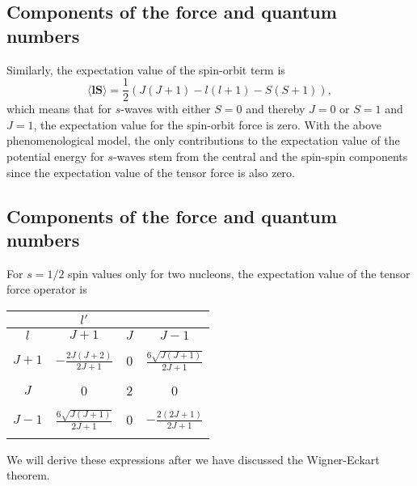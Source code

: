 \documentclass[%
twoside,                 %
final,                   %
10pt]{article}
\begin{document}
\subsection{Components of the force and quantum numbers}
\begin{block}{}

Similarly, the expectation value of the spin-orbit term is 
\[
\langle \mathbf{l}\mathbf{S} \rangle = \frac{1}{2}\left( J(J+1)-l(l+1)-S(S+1)\right),
\]
which means that for $s$-waves with either $S=0$ and thereby $J=0$ or $S=1$ and $J=1$, 
the expectation value for the
spin-orbit force is zero. With the above phenomenological model, the
only contributions to the expectation value of the potential energy for $s$-waves
stem  from the central and the spin-spin components since the
expectation value of the tensor force is also zero.
\end{block}

\subsection{Components of the force and quantum numbers}
\begin{block}{}
 For $s=1/2$ spin values only for two nucleons, the expectation value of the tensor force operator is 


{\footnotesize
\begin{tabular}{cccc}
\hline
\multicolumn{1}{c}{  } & \multicolumn{1}{c}{ $l'$ } & \multicolumn{1}{c}{  } & \multicolumn{1}{c}{  } \\
\hline
$l$   & $J+1$                         & $J$ & $J-1$                         \\
\hline
      &                               &     &                               \\
$J+1$ & $-\frac{2J(J+2)}{2J+1}$       & 0   & $\frac{6\sqrt{J(J+1)}}{2J+1}$ \\
      &                               &     &                               \\
$J$   & 0                             & 2   & 0                             \\
      &                               &     &                               \\
$J-1$ & $\frac{6\sqrt{J(J+1)}}{2J+1}$ & 0   & $-\frac{2(2J+1)}{2J+1}$       \\
      &                               &     &                               \\
\hline
\end{tabular}
}

\noindent
We will derive these expressions after we have discussed the Wigner-Eckart theorem. 
\end{block}
\end{document}
